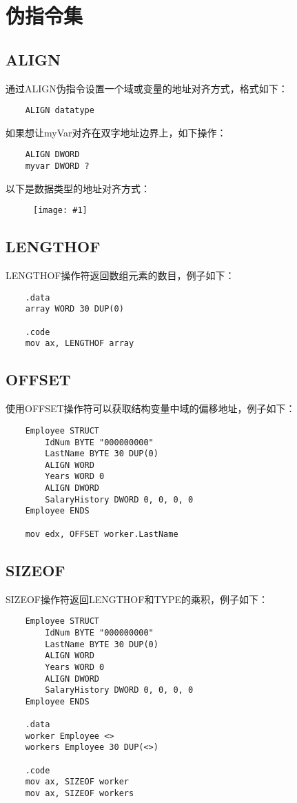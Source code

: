 \documentclass[a4paper,left=2.5cm,right=2.5cm,11pt]{article}
\newcommand{\fic}[1]{\begin{figure}[H]
		\center
		\texttt{[image: \#1]}
	\end{figure}}
\begin{document}
\tableofcontents

\clearpage

\section{伪指令集}

\subsection{ALIGN}
	通过ALIGN伪指令设置一个域或变量的地址对齐方式，格式如下：
	\begin{lstlisting}
	ALIGN datatype
	\end{lstlisting}

	如果想让myVar对齐在双字地址边界上，如下操作：
	\begin{lstlisting}
	ALIGN DWORD
	myvar DWORD ?
	\end{lstlisting}

	以下是数据类型的地址对齐方式：
	\fic{1.png}

\subsection{LENGTHOF}
	LENGTHOF操作符返回数组元素的数目，例子如下：
	\begin{lstlisting}
	.data
	array WORD 30 DUP(0)

	.code
	mov ax, LENGTHOF array
	\end{lstlisting}

\subsection{OFFSET}
	使用OFFSET操作符可以获取结构变量中域的偏移地址，例子如下：
	\begin{lstlisting}
	Employee STRUCT
		IdNum BYTE "000000000"
		LastName BYTE 30 DUP(0)
		ALIGN WORD
		Years WORD 0
		ALIGN DWORD
		SalaryHistory DWORD 0, 0, 0, 0
	Employee ENDS

	mov edx, OFFSET worker.LastName	
	\end{lstlisting}

\subsection{SIZEOF}
	SIZEOF操作符返回LENGTHOF和TYPE的乘积，例子如下：
	\begin{lstlisting}
	Employee STRUCT
		IdNum BYTE "000000000"
		LastName BYTE 30 DUP(0)
		ALIGN WORD
		Years WORD 0
		ALIGN DWORD
		SalaryHistory DWORD 0, 0, 0, 0
	Employee ENDS

	.data
	worker Employee <>
	workers Employee 30 DUP(<>)

	.code
	mov ax, SIZEOF worker
	mov ax, SIZEOF workers
	\end{lstlisting}
\end{document}
